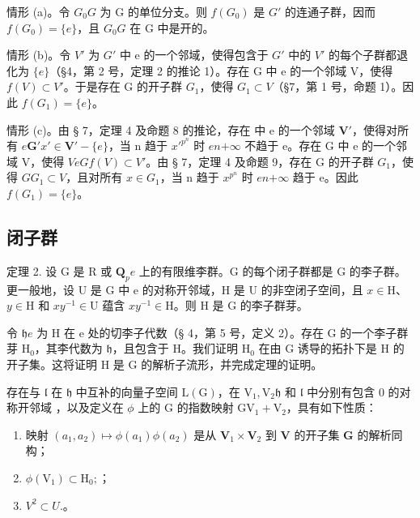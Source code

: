 情形 (a)。令 \(G_0\)\(G\) 为 G 的单位分支。则 \(f(G_0)\) 是 \(G'\) 的连通子群，因而 \(f(G_0) = \{e\}\)，且 \(G_0\)\(G\) 在 G 中是开的。

情形 (b)。令 \(V'\) 为 \(G'\) 中 e 的一个邻域，使得包含于 \(G'\) 中的 \(V'\) 的每个子群都退化为 \(\{e\}\)（§4，第 2 号，定理 2 的推论 1）。存在 G 中 e 的一个邻域 V，使得 \(f(V) \subset V'\)。于是存在 G 的开子群 \(G_{1}\)，使得 \(G_{1} \subset V\)（§7，第 1 号，命题 1）。因此 \(f(G_{1}) = \{e\}\)。

情形 (c)。由 § 7，定理 4 及命题 8 的推论，存在  中 e 的一个邻域 \(\mathbf{V}'\)，使得对所有 \(e\)\(\mathbf{G}'\)\(x' \in \mathbf{V}' - \{e\}\)，当 n 趋于 \(x'^{p^n}\) 时 \(e\)\(n\)\(+\infty\) 不趋于 e。存在 G 中 e 的一个邻域 V，使得 \(V\)\(e\)\(G\)\(f(V) \subset V'\)。由 § 7，定理 4 及命题 9，存在 G 的开子群 \(G_1\)，使得 \(G\)\(G_1 \subset V\)，且对所有 \(x \in G_1\)，当 n 趋于 \(x^{p^n}\) 时 \(e\)\(n\)\(+\infty\) 趋于 e。因此 \(f(G_1) = \{e\}\)。

\subsection{闭子群}

定理 2. 设 G 是 R 或 \(\mathbf{Q}_{p}\)\(e\) 上的有限维李群。G 的每个闭子群都是 G 的李子群。更一般地，设 U 是 G 中 e 的对称开邻域，H 是 U 的非空闭子空间，且 \(x \in \mathrm{H}\)、\(y \in \mathrm{H}\) 和 \(xy^{-1} \in \mathrm{U}\) 蕴含 \(xy^{-1} \in \mathrm{H}\)。则 H 是 G 的李子群芽。

令 \(\mathfrak{h}\)\(e\) 为 H 在 e 处的切李子代数（§ 4，第 5 号，定义 2）。存在 G 的一个李子群芽 \(\mathrm{H}_0\)，其李代数为 \(\mathfrak{h}\)，且包含于 H。我们证明 \(\mathrm{H}_0\) 在由 G 诱导的拓扑下是 H 的开子集。这将证明 H 是 G 的解析子流形，并完成定理的证明。

存在与 \(\mathfrak{l}\) 在 \(\mathfrak{h}\) 中互补的向量子空间 \(\mathrm{L}(\mathrm{G})\)，在 \(\mathrm{V}_1, \mathrm{V}_2\)\(\mathfrak{h}\) 和 \(\mathfrak{l}\) 中分别有包含 0 的对称开邻域 ，以及定义在 \(\phi\) 上的 G 的指数映射 \(\mathrm{G}\)\(\mathrm{V}_1 + \mathrm{V}_2\)，具有如下性质：

\begin{enumerate}
\def\labelenumi{(\alph{enumi})}
\item
  映射 \((a_{1}, a_{2}) \mapsto \phi(a_{1})\phi(a_{2})\) 是从 \(\mathbf{V}_{1} \times \mathbf{V}_{2}\) 到 \(\mathbf{V}\) 的开子集 \(\mathbf{G}\) 的解析同构；
\item
  \(\phi (\mathrm{V}_1)\subset \mathrm{H}_0;\)；
\item
  \(V^{2} \subset U.\)。
\end{enumerate}

